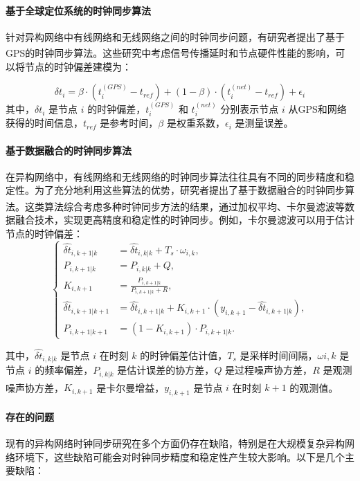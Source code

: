 \documentclass[UTF8,a4paper,12pt]{ctexart}
\numberwithin{equation}{section}
\begin{document}
\paragraph{基于全球定位系统的时钟同步算法}
针对异构网络中有线网络和无线网络之间的时钟同步问题，有研究者提出了基于GPS的时钟同步算法\textsuperscript{\cite{mehrpouyan2011new}}。这些研究中考虑信号传播延时和节点硬件性能的影响，可以将节点的时钟偏差建模为：

\begin{equation}
	\delta t_{i} = \beta \cdot (t_{i}^{(GPS)} - t_{ref}) + (1 - \beta) \cdot (t_{i}^{(net)} - t_{ref}) + \epsilon_{i}
\end{equation}
其中，$\delta t_{i}$ 是节点 $i$ 的时钟偏差，$t_{i}^{(GPS)}$ 和 $t_{i}^{(net)}$ 分别表示节点 $i$ 从GPS和网络获得的时间信息，$t_{ref}$ 是参考时间，$\beta$ 是权重系数，$\epsilon_{i}$ 是测量误差。
\paragraph{基于数据融合的时钟同步算法}
在异构网络中，有线网络和无线网络的时钟同步算法往往具有不同的同步精度和稳定性。为了充分地利用这些算法的优势，研究者提出了基于数据融合的时钟同步算法\textsuperscript{\cite{anees2020hesitant}}。这类算法综合考虑多种时钟同步方法的结果，通过加权平均、卡尔曼滤波等数据融合技术，实现更高精度和稳定性的时钟同步。例如，卡尔曼滤波可以用于估计节点的时钟偏差：
\begin{equation}
	\left\{
	\begin{aligned}
		\hat{\delta t}_{i,k+1|k} &= \hat{\delta t}_{i,k|k} + T_s \cdot \omega_{i,k},\\
		P_{i,k+1|k} &= P_{i,k|k} + Q,\\
		K_{i,k+1} &= \frac{P_{i,k+1|k}}{P_{i,k+1|k} + R},\\
		\hat{\delta t}_{i,k+1|k+1} &= \hat{\delta t}_{i,k+1|k} + K_{i,k+1} \cdot (y_{i,k+1} - \hat{\delta t}_{i,k+1|k}),\\
		P_{i,k+1|k+1} &= (1 - K_{i,k+1}) \cdot P_{i,k+1|k}.
	\end{aligned}
	\right.
\end{equation}

其中，$\hat{\delta t}_{i,k|k}$ 是节点 $i$ 在时刻 $k$ 的时钟偏差估计值，$T_s$ 是采样时间间隔，$\omega{i,k}$ 是节点 $i$ 的频率偏差，$P_{i,k|k}$ 是估计误差的协方差，$Q$ 是过程噪声协方差，$R$ 是观测噪声协方差，$K_{i,k+1}$ 是卡尔曼增益，$y_{i,k+1}$ 是节点 $i$ 在时刻 $k+1$ 的观测值\textsuperscript{\cite{grewal2020kalman}}。

\paragraph{存在的问题}现有的异构网络时钟同步研究在多个方面仍存在缺陷，特别是在大规模复杂异构网络环境下，这些缺陷可能会对时钟同步精度和稳定性产生较大影响。以下是几个主要缺陷：
\end{document}
